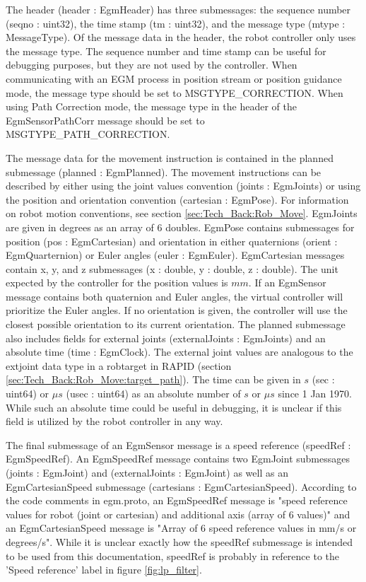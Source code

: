 \documentclass{cslthse-msc}
\begin{document}
The header (header : EgmHeader) has three submessages: the sequence number (seqno : uint32), the time stamp (tm : uint32), and the message type (mtype : MessageType). Of the message data in the header, the robot controller only uses the message type. The sequence number and time stamp can be useful for debugging purposes, but they are not used by the controller. When communicating with an EGM process in position stream or position guidance mode, the message type should be set to {\scriptsize{MSGTYPE\_CORRECTION}}. When using Path Correction mode, the message type in the header of the EgmSensorPathCorr message should be set to {\scriptsize{MSGTYPE\_PATH\_CORRECTION}}.\par
The message data for the movement instruction is contained in the planned submessage (planned : EgmPlanned). The movement instructions can be described by either using the joint values convention (joints  : EgmJoints) or using the position and orientation convention (cartesian : EgmPose). For information on robot motion conventions, see section \ref{sec:Tech_Back:Rob_Move}. EgmJoints are given in degrees as an array of 6 doubles. EgmPose contains submessages for position (pos : EgmCartesian) and orientation in either quaternions (orient : EgmQuarternion) or Euler angles (euler : EgmEuler). EgmCartesian messages contain x, y, and z submessages (x : double, y : double, z : double). The unit expected by the controller for the position values is  $mm$. If an EgmSensor message contains both quaternion and Euler angles, the virtual controller will prioritize the Euler angles. If no orientation is given, the controller will use the closest possible orientation to its current orientation. The planned submessage also includes fields for external joints (externalJoints : EgmJoints) and an absolute time (time : EgmClock). The external joint values are analogous to the extjoint data type in a robtarget in RAPID (section \ref{sec:Tech_Back:Rob_Move:target_path}). The time can be given in $s$ (sec : uint64) or $\mu s$ (usec : uint64) as an absolute number of $s$ or $\mu s$ since 1 Jan 1970. While such an absolute time could be useful in debugging, it is unclear if this field is utilized by the robot controller in any way. \par

The final submessage of an EgmSensor message is a speed reference (speedRef : EgmSpeedRef). An EgmSpeedRef message contains two EgmJoint submessages (joints : EgmJoint) and (externalJoints : EgmJoint) as well as an EgmCartesianSpeed submessage (cartesians : EgmCartesianSpeed). According to the code comments in egm.proto, an EgmSpeedRef message is "speed reference values for robot (joint or cartesian) and additional axis (array of 6 values)" and an EgmCartesianSpeed message is "Array of 6 speed reference values in mm/s or degrees/s". While it is unclear exactly how the speedRef submessage is intended to be used from this documentation, speedRef is probably in reference to the 'Speed reference' label in figure \ref{fig:lp_filter}. \par
\end{document}
